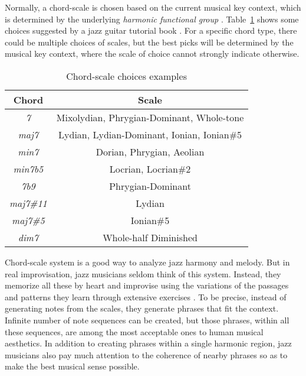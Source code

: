 Normally, a chord-scale is chosen based on the current musical key context, which is determined by the underlying {\it harmonic functional group} \cite{hojnackijazz,levine2011jazztheory}. Table~\ref{tab:5-chordscale} shows some choices suggested by a jazz guitar tutorial book \cite{jazzguitarbook}. For a specific chord type, there could be multiple choices of scales, but the best picks will be determined by the musical key context, where the scale of choice cannot strongly indicate otherwise.
\begin{table}
\centering
\footnotesize
\begin{tabular}{|c|c|} \hline
Chord & Scale \\ \hline
\textit{7} & Mixolydian, Phrygian-Dominant, Whole-tone \\ \hline
\textit{maj7} & Lydian, Lydian-Dominant, Ionian, Ionian\#5 \\ \hline
\textit{min7} & Dorian, Phrygian, Aeolian \\ \hline
\textit{min7b5} & Locrian, Locrian\#2 \\ \hline
\textit{7b9} & Phrygian-Dominant \\ \hline
\textit{maj7\#11} & Lydian \\ \hline
\textit{maj7\#5} & Ionian\#5 \\ \hline
\textit{dim7} & Whole-half Diminished \\ \hline
\end{tabular}
\caption{Chord-scale choices examples}
\label{tab:5-chordscale}
\end{table}

Chord-scale system is a good way to analyze jazz harmony and melody. But in real improvisation, jazz musicians seldom think of this system. Instead, they memorize all these by heart and improvise using the variations of the passages and patterns they learn through extensive exercises \cite{jazzguitarimpro}. To be precise, instead of generating notes from the scales, they generate phrases that fit the context. Infinite number of note sequences can be created, but those phrases, within all these sequences, are among the most acceptable ones to human musical aesthetics. In addition to creating phrases within a single harmonic region, jazz musicians also pay much attention to the coherence of nearby phrases so as to make the best musical sense possible.

